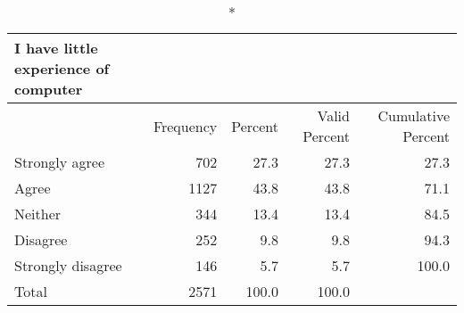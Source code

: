\documentclass[
]{article}
\begin{document}
\begin{longtable}{l|rrrr}
\caption*{
{\large I have little experience of computer}
} \\ 
\toprule
\multicolumn{1}{l}{} & Frequency & Percent & Valid Percent & Cumulative Percent \\ 
\midrule\addlinespace[2.5pt]
Strongly agree & 702 & 27.3 & 27.3 & 27.3 \\ 
Agree & 1127 & 43.8 & 43.8 & 71.1 \\ 
Neither & 344 & 13.4 & 13.4 & 84.5 \\ 
Disagree & 252 & 9.8 & 9.8 & 94.3 \\ 
Strongly disagree & 146 & 5.7 & 5.7 & 100.0 \\ 
Total & 2571 & 100.0 & 100.0 &  \\ 
\bottomrule
\end{longtable}
\end{document}

